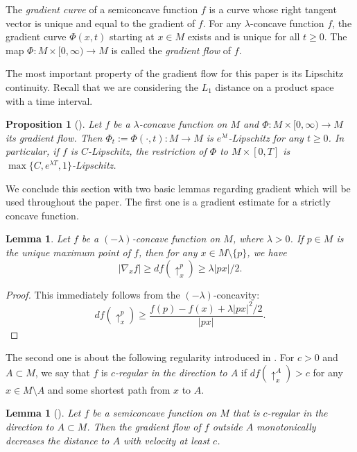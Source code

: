 \documentclass[a4paper,12pt]{amsart}
\theoremstyle{plain}
\newtheorem{prop}[thm]{Proposition}
\newtheorem{lem}[thm]{Lemma}
\theoremstyle{definition}
\numberwithin{thm}{section}
\numberwithin{equation}{section}
\begin{document}
The \textit{gradient curve} of a semiconcave function $f$ is a curve whose right tangent vector is unique and equal to the gradient of $f$.
For any $\lambda$-concave function $f$, the gradient curve $\Phi(x,t)$ starting at $x\in M$ exists and is unique for all $t\ge0$. 
The map $\Phi:M\times[0,\infty)\to M$ is called the \textit{gradient flow} of $f$.

The most important property of the gradient flow for this paper is its Lipschitz continuity.
Recall that we are considering the $L_1$ distance on a product space with a time interval.

\begin{prop}[{\cite[2.1.4]{Pet:sc}}]\label{prop:lip}
Let $f$ be a $\lambda$-concave function on $M$ and $\Phi:M\times[0,\infty)\to M$ its gradient flow.
Then $\Phi_t:=\Phi(\cdot,t):M\to M$ is $e^{\lambda t}$-Lipschitz for any $t\ge 0$.
In particular, if $f$ is $C$-Lipschitz, the restriction of $\Phi$ to $M\times[0,T]$ is $\max\{C,e^{\lambda T},1\}$-Lipschitz.
\end{prop}

We conclude this section with two basic lemmas regarding gradient which will be used throughout the paper.
The first one is a gradient estimate for a strictly concave function.

\begin{lem}\label{lem:grad}
Let $f$ be a $(-\lambda)$-concave function on $M$, where $\lambda>0$.
If $p\in M$ is the unique maximum point of $f$, then for any $x\in M\setminus\{p\}$, we have
\[|\nabla_xf|\ge df(\uparrow_x^p)\ge\lambda|px|/2.\]
\end{lem}

\begin{proof}
This immediately follows from the $(-\lambda)$-concavity:
\[df(\uparrow_x^p)\ge\frac{f(p)-f(x)+\lambda|px|^2/2}{|px|}.\]
\end{proof}

The second one is about the following regularity introduced in \cite{MY:stab}.
For $c>0$ and $A\subset M$, we say that $f$ is \textit{$c$-regular in the direction to $A$} if $df(\uparrow_x^A)>c$ for any $x\in M\setminus A$ and some shortest path from $x$ to $A$.

\begin{lem}[{\cite[2.3]{MY:stab}}]\label{lem:reg}
Let $f$ be a semiconcave function on $M$ that is $c$-regular in the direction to $A\subset M$.
Then the gradient flow of $f$ outside $A$ monotonically decreases the distance to $A$ with velocity at least $c$.
\end{lem}
\end{document}
